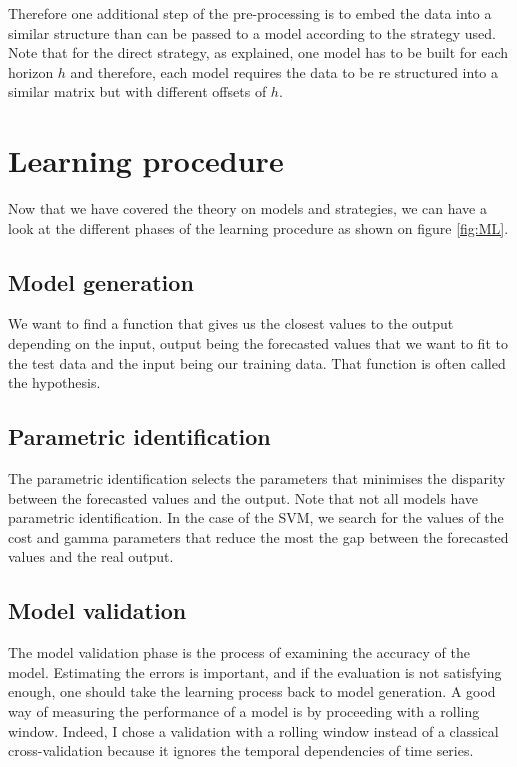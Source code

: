 \documentclass[11pt,a4paper,oneside]{book}
\begin{document}
Therefore one additional step of the pre-processing is to embed the data into a similar structure than can be passed to a model according to the strategy used. Note that for the direct strategy, as explained, one model has to be built for each horizon $h$ and therefore, each model requires the data to be re structured into a similar matrix but with different offsets of $h$.



\section{Learning procedure}

Now that we have covered the theory on models and strategies, we can have a look at the different phases of the learning procedure as shown on figure \ref{fig:ML}.


\subsection{Model generation}

We want to find a function that gives us the closest values to the output depending on the input, output being the forecasted values that we want to fit to the test data and the input being our training data. That function is often called the hypothesis. \cite{BenTaieb}


\subsection{Parametric identification}

The parametric identification selects the parameters that minimises the disparity between the forecasted values and the output. Note that not all models have parametric identification. In the case of the SVM, we search for the values of the cost and gamma parameters that reduce the most the gap between the forecasted values and the real output. \cite{BenTaieb}


\subsection{Model validation}

The model validation phase is the process of examining the accuracy of the model. Estimating the errors is important, and if the evaluation is not satisfying enough, one should take the learning process back to model generation. A good way of measuring the performance of a model is by proceeding with a rolling window. Indeed, I chose a validation with a rolling window instead of a classical cross-validation because it ignores the temporal dependencies of time series. \cite{BenTaieb}
\end{document}
